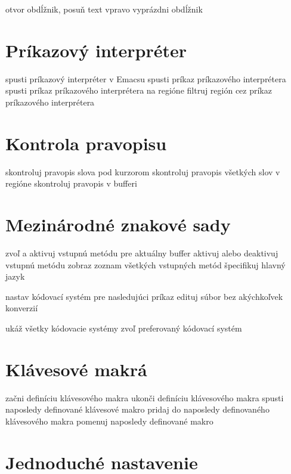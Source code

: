  otvor obdĺžnik, posuň text vpravo
 vyprázdni obdĺžnik

\section{Príkazový interpréter}

 spusti príkazový interpréter v Emacsu
 spusti príkaz príkazového interprétera
 spusti príkaz príkazového interprétera na regióne
 filtruj región cez príkaz príkazového interprétera

\section{Kontrola pravopisu}

 skontroluj pravopis slova pod kurzorom
 skontroluj pravopis všetkých slov v regióne
 skontroluj pravopis v bufferi

\section{Mezinárodné znakové sady}

 zvoľ a aktivuj vstupnú metódu pre aktuálny buffer
 aktivuj alebo deaktivuj vstupnú metódu
 zobraz zoznam všetkých vstupných metód
 špecifikuj hlavný jazyk

 nastav kódovací systém pre nasledujúci príkaz
 edituj súbor bez akýchkoľvek konverzií

 ukáž všetky kódovacie systémy
 zvoľ preferovaný kódovací systém

\section{Klávesové makrá}

 začni definíciu klávesového makra
 ukonči definíciu klávesového makra
 spusti naposledy definované klávesové makro
 pridaj do naposledy definovaného klávesového makra
 pomenuj naposledy definované makro

\section{Jednoduché nastavenie}

